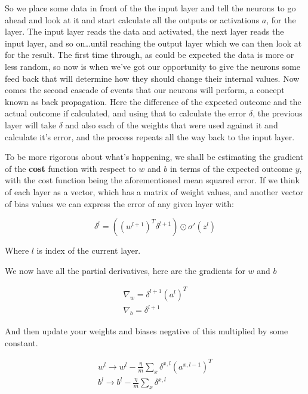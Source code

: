 \documentclass[a4paper,10pt]{article}
\begin{document}
So we place some data in front of the the input layer and tell the neurons to go ahead and look at it and start
calculate all the outputs or activations $a$, for the layer. The input layer reads the data and activated, the next
layer reads the input layer, and so on\ldots until reaching the output layer which we can then look at for the result. 
The first time through, as could be expected the data is more or less random, so now is when we've got our opportunity
to give the neurons some feed back that will determine how they should change their internal values.  Now comes the
second cascade of events that our neurons will perform, a concept known as back propagation.  Here the difference of the
expected outcome and the actual outcome if calculated, and using that to calculate the error $\delta$, the previous
layer will take $\delta$ and also each of the weights that were used against it and calculate it's error, and the
process repeats all the way back to the input layer.

To be more rigorous about what's happening, we shall be estimating the gradient of the \textbf{cost} function with
respect to $w$ and $b$ in terms of the expected outcome $y$, with the cost function being the aforementioned mean
squared error.  If we think of each layer as a vector, which has a matrix of weight values,
and another vector of bias values we can express the error of any given layer with:

\begin{equation}\label{errormatr}
\delta^l = ((w^{l+1})^T \delta^{l+1}) \odot \sigma'(z^l)
\end{equation}

{\centering\small Where $l$ is index of the current layer. 
\par}

We now have all the partial derivatives, here are the gradients for $w$ and $b$ 

\begin{gather}\label{gradientsw}
\nabla_w = \delta^{l+1}(a^l)^T\\
\nabla_b = \delta^{l+1}
\end{gather}

And then update your weights and biases negative of this multiplied by some constant.

\begin{gather}\label{graupdatw}
w^l \rightarrow
  w^l-\frac{\eta}{m} \sum_x \delta^{x,l} (a^{x,l-1})^T\\
b^l \rightarrow b^l-\frac{\eta}{m}
  \sum_x \delta^{x,l}
\end{gather}
\end{document}
